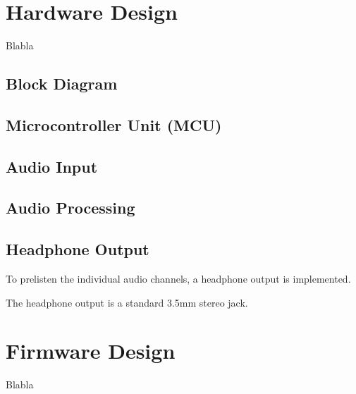 \newpage
\section{Hardware Design}
Blabla

\subsection{Block Diagram}

\subsection{Microcontroller Unit (MCU)}



\subsection{Audio Input}

\subsection{Audio Processing}

\subsection{Headphone Output}

To prelisten the individual audio channels, a headphone output is implemented.

The headphone output is a standard 3.5mm stereo jack.



\newpage
\section{Firmware Design}
Blabla




